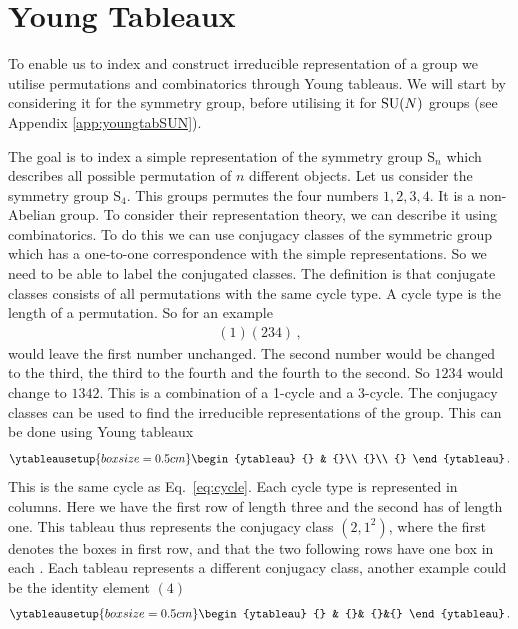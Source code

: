 \section{Young Tableaux} \label{app:youngtab}
To enable us to index and construct irreducible representation of a group we utilise permutations and combinatorics through Young tableaus. We will start by considering it for the symmetry group, before utilising it for $\mathrm{SU}(N)$ groups (see Appendix \ref{app:youngtabSUN}). 

The goal is to index a simple representation of the symmetry group $\mathrm{S}_n$ which describes all possible permutation of $n$ different objects. Let us consider the symmetry group $\mathrm{S}_4$. This groups permutes the four numbers $1,2,3,4$. It is a non-Abelian group. To consider their representation theory, we can describe it using combinatorics. To do this we can use conjugacy classes of the symmetric group which has a one-to-one correspondence with the simple representations. So we need to be able to label the conjugated classes. The definition is that conjugate classes consists of all permutations with the same cycle type. A cycle type is the length of a permutation. So for an example
\begin{align}
    (1)(234)\,,
    \label{eq:cycle}
\end{align}
would leave the first number unchanged. The second number would be changed to the third, the third to the fourth and the fourth to the second. So $1234$ would change to $1342$. This is a combination of a 1-cycle and a 3-cycle. The conjugacy classes can be used to find the irreducible representations of the group. This can be done using Young tableaux \cite{Georgi:1999wka}
\begin{align}
    \ytableausetup{boxsize=0.5cm}
    \begin{ytableau}
        {} & {}\\
        {}\\
        {}
    \end{ytableau}\,.
\end{align}
This is the same cycle as Eq.~\ref{eq:cycle}. Each cycle type is represented in columns. Here we have the first row of length three and the second has of length one. This tableau thus represents the conjugacy class $(2,1^2)$, where the first denotes the boxes in first row, and that the two following rows have one box in each . Each tableau represents a different conjugacy class, another example could be the identity element $(4)$
\begin{align}
    \ytableausetup{boxsize=0.5cm}
    \begin{ytableau}
        {} & {}& {}&{}
    \end{ytableau}\,.
\end{align}
